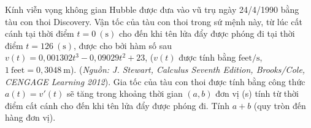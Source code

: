 \begin{bt}%
	Kính viễn vọng không gian Hubble được đưa vào vũ trụ ngày 24/4/1990 bằng tàu con thoi Discovery.
	Vận tốc của tàu con thoi trong sứ mệnh này, từ lúc cất cánh tại thời điểm $t=0~(\text{s})$ cho đến khi tên lửa đẩy được phóng đi tại thời điểm $t=126~(\text{s})$, được cho bởi hàm số sau
	$v(t) = 0{,}001302t^3 - 0{,}09029t^2+23$,
	($v(t)$ được tính bằng $\text{feet}/\text{s}$, $1~\text{feet} = 0{,}3048~\text{m}$).
	(\textit{Nguồn: J. Stewart, Calculus Seventh Edition, Brooks/Cole, CENGAGE Learning 2012}).
	Gia tốc của tàu con thoi được tính bằng công thức $a(t)=v'(t)$ sẽ tăng trong khoảng thời gian $(a,b)$ đơn vị (s) tính từ thời điểm cất cánh cho đến khi tên lửa đẩy được phóng đi.
	Tính $a+b$ (quy tròn đến hàng đơn vị).
\end{bt}

